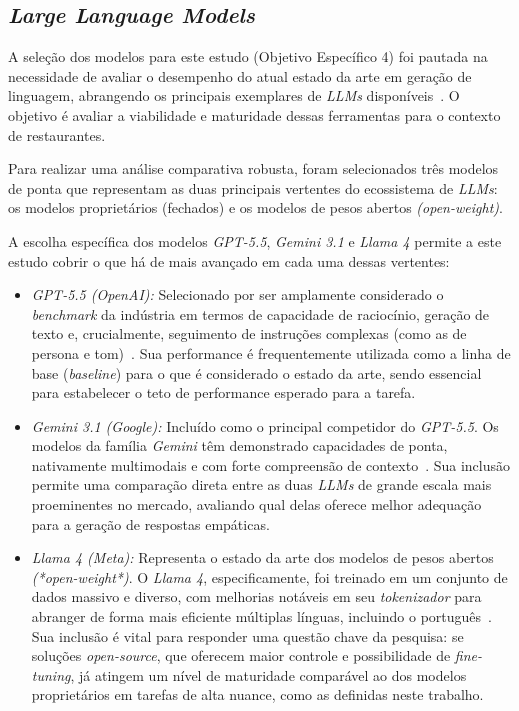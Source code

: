\documentclass[12pt, a4paper]{article}
\numberwithin{equation}{section}
\begin{document}
\subsection{\textit{Large Language Models}}

A seleção dos modelos para este estudo (Objetivo Específico 4) foi pautada na necessidade de avaliar o desempenho do atual estado da arte em geração de linguagem, abrangendo os principais exemplares de \textit{LLMs} disponíveis~\cite{zhao2023Survey}. O objetivo é avaliar a viabilidade e maturidade dessas ferramentas para o contexto de restaurantes.

Para realizar uma análise comparativa robusta, foram selecionados três modelos de ponta que representam as duas principais vertentes do ecossistema de \textit{LLMs}: os modelos proprietários (fechados) e os modelos de pesos abertos \textit{(open-weight)}.

A escolha específica dos modelos \textit{GPT-5.5}, \textit{Gemini 3.1} e \textit{Llama 4} permite a este estudo cobrir o que há de mais avançado em cada uma dessas vertentes:

\begin{itemize}

\item \textit{GPT-5.5 (OpenAI):} Selecionado por ser amplamente considerado o \textit{benchmark} da indústria em termos de capacidade de raciocínio, geração de texto e, crucialmente, seguimento de instruções complexas (como as de persona e tom)~\cite{Minaee2025Survey}. Sua performance é frequentemente utilizada como a linha de base (\textit{baseline}) para o que é considerado o estado da arte, sendo essencial para estabelecer o teto de performance esperado para a tarefa.

\item \textit{Gemini 3.1 (Google):} Incluído como o principal competidor do \textit{GPT-5.5}. Os modelos da família \textit{Gemini} têm demonstrado capacidades de ponta, nativamente multimodais e com forte compreensão de contexto~\cite{google2024gemini}. Sua inclusão permite uma comparação direta entre as duas \textit{LLMs} de grande escala mais proeminentes no mercado, avaliando qual delas oferece melhor adequação para a geração de respostas empáticas.

\item \textit{Llama 4 (Meta):} Representa o estado da arte dos modelos de pesos abertos \textit{(*open-weight*)}. O \textit{Llama 4}, especificamente, foi treinado em um conjunto de dados massivo e diverso, com melhorias notáveis em seu \textit{tokenizador} para abranger de forma mais eficiente múltiplas línguas, incluindo o português~\cite{meta2025llama4}. Sua inclusão é vital para responder uma questão chave da pesquisa: se soluções \textit{open-source}, que oferecem maior controle e possibilidade de \textit{fine-tuning}, já atingem um nível de maturidade comparável ao dos modelos proprietários em tarefas de alta nuance, como as definidas neste trabalho.

\end{itemize}
\end{document}
